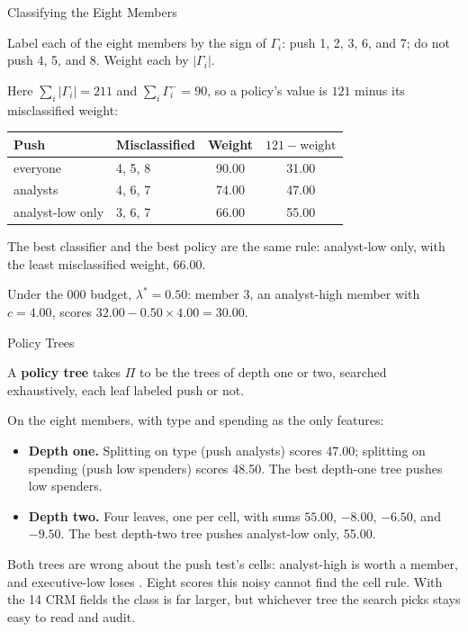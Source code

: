 \documentclass[aspectratio=169, 11pt, handout]{beamer}
\begin{document}
\begin{frame}{Classifying the Eight Members}

Label each of the eight members by the sign of $\Gamma_i$: push 1, 2, 3, 6, and 7; do not push 4, 5, and 8. Weight each by $|\Gamma_i|$.

\medskip

Here $\sum_i |\Gamma_i| = 211$ and $\sum_i \Gamma_i^- = 90$, so a policy's value is $121$ minus its misclassified weight:

\begin{center}
\small
\begin{tabular}{llcc}
\toprule
\textbf{Push} & \textbf{Misclassified} & \textbf{Weight} & $121 - \text{weight}$ \\
\midrule
everyone & 4, 5, 8 & 90.00 & 31.00 \\
analysts & 4, 6, 7 & 74.00 & 47.00 \\
analyst-low only & 3, 6, 7 & 66.00 & 55.00 \\
\bottomrule
\end{tabular}
\end{center}

The best classifier and the best policy are the same rule: analyst-low only, with the least misclassified weight, 66.00.

\medskip

Under the 000 budget, $\lambda^\ast = 0.50$: member 3, an analyst-high member with $c = 4.00$, scores $32.00 - 0.50 \times 4.00 = 30.00$.
\end{frame}

\begin{frame}{Policy Trees}

A \textbf{policy tree} takes $\Pi$ to be the trees of depth one or two, searched exhaustively, each leaf labeled push or not.

\bigskip

On the eight members, with type and spending as the only features:
\begin{itemize}
  \item \textbf{Depth one.} Splitting on type (push analysts) scores 47.00; splitting on spending (push low spenders) scores 48.50. The best depth-one tree pushes low spenders.
  \item \textbf{Depth two.} Four leaves, one per cell, with sums $55.00$, $-8.00$, $-6.50$, and $-9.50$. The best depth-two tree pushes analyst-low only, 55.00.
\end{itemize}

\bigskip

Both trees are wrong about the push test's cells: analyst-high is worth  a member, and executive-low loses . Eight scores this noisy cannot find the cell rule. With the 14 CRM fields the class is far larger, but whichever tree the search picks stays easy to read and audit.
\end{frame}
\end{document}
